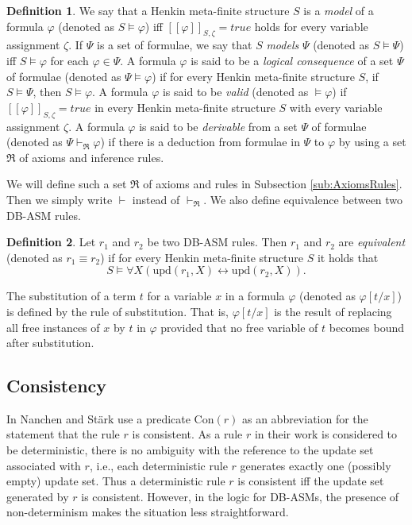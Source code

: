 \documentclass[preprint,11pt]{elsarticle}
\theoremstyle{definition}
\newtheorem{definition}{Definition}[section]
\theoremstyle{remark}
\begin{document}
\begin{definition}\label{def-implied-formula}
We say that a Henkin meta-finite structure $S$ is a \emph{model} of a formula $\varphi$ (denoted as $S \models \varphi$) iff $[\![\varphi]\!]_{S,\zeta}= \textit{true}$ holds for every variable assignment $\zeta$.  If $\Psi$ is a set of formulae, we say that $S$ \emph{models} $\Psi$ (denoted as $S \models \Psi$) iff $S \models \varphi$ for each $\varphi \in \Psi$.
A formula $\varphi$ is said to be a \emph{logical consequence} of a set $\Psi$ of formulae (denoted as $\Psi\models\varphi$) if for every Henkin meta-finite structure $S$, if $S \models \Psi$, then $S \models \varphi$.
A formula $\varphi$ is said to be \emph{valid} (denoted as $\models \varphi$) if $[\![\varphi]\!]_{S,\zeta}=true$ in every Henkin meta-finite structure $S$ with every variable assignment $\zeta$.
A formula $\varphi$ is said to be \emph{derivable} from a set $\Psi$ of formulae (denoted as $\Psi\vdash_{\mathfrak{R}}\varphi$) if there is a deduction from formulae in $\Psi$
to $\varphi$ by using a set $\mathfrak{R}$ of axioms and inference rules.

\end{definition}

We will define such a set $\mathfrak{R}$ of axioms and rules in Subsection \ref{sub:AxiomsRules}. Then we simply write $\vdash$ instead of $\vdash_{\mathfrak{R}}$. We also define equivalence between two DB-ASM rules. 

\begin{definition} \label{def-equivalent-rules}Let $r_1$ and $r_2$ be two DB-ASM rules. Then
$r_1$ and $r_2$ are \emph{equivalent} (denoted as $r_1\equiv r_2$)
if for every Henkin meta-finite structure $S$ it holds that \[S \models \forall X (\mathrm{upd}(r_1,X)\leftrightarrow \mathrm{upd}(r_2,X)).\]
\end{definition}

The substitution of a term $t$ for a variable $x$ in a formula
$\varphi$ (denoted as $\varphi[t/x]$) is defined by the rule of
substitution. That is, $\varphi[t/x]$ is the result of replacing all
free instances of $x$ by $t$ in $\varphi$ provided that no free
variable of $t$ becomes bound after substitution.

\subsection{Consistency}\label{sub:Consistency}

In \cite{RobertLogicASM} Nanchen and St\"ark use a predicate $\mathrm{Con}(r)$ as an
abbreviation for the statement that the rule $r$ is consistent. As a rule $r$ in their work is considered to be
deterministic, there is no ambiguity with the reference to the
update set associated with $r$, i.e., each deterministic rule $r$ generates exactly one (possibly empty) update set. Thus a deterministic rule $r$ is consistent iff the update set generated by $r$ is consistent.
However, in the logic for DB-ASMs, the presence of non-determinism
makes the situation less straightforward.
\end{document}
